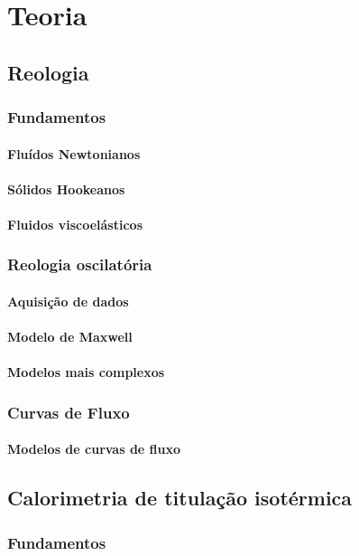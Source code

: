 \part{Teoria}
	\chapter{Reologia}
		\section{Fundamentos}
			\subsection{Fluídos Newtonianos}
			\subsection{Sólidos Hookeanos}
			\subsection{Fluidos viscoelásticos}
		\section{Reologia oscilatória}
			\subsection{Aquisição de dados}
			\subsection{Modelo de Maxwell}
			\subsection{Modelos mais complexos}
		\section{Curvas de Fluxo}
			\subsection{Modelos de curvas de fluxo}
	\chapter{Calorimetria de titulação isotérmica}
		\section{Fundamentos}
